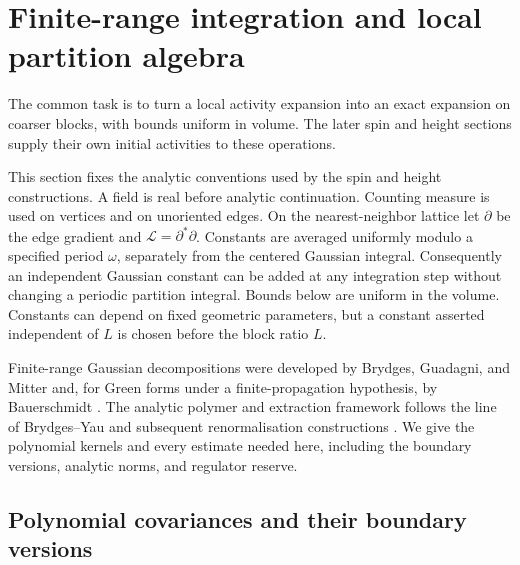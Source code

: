 \section{Finite-range integration and local partition algebra}\label{rg:section}

The common task is to turn a local activity expansion into an exact
expansion on coarser blocks, with bounds uniform in volume.  The later
spin and height sections supply their own initial activities to these
operations.

This section fixes the analytic conventions used by the spin and height constructions.  A field is real before analytic continuation.  Counting measure is used on vertices and on unoriented edges.  On the nearest-neighbor lattice let $\partial$ be the edge gradient and $\mathcal L=\partial^*\partial$.  Constants are averaged uniformly modulo a specified period $\omega$, separately from the centered Gaussian integral.  Consequently an independent Gaussian constant can be added at any integration step without changing a periodic partition integral.  Bounds below are uniform in the volume.  Constants can depend on fixed geometric parameters, but a constant asserted independent of $L$ is chosen before the block ratio $L$.

Finite-range Gaussian decompositions were developed by
Brydges, Guadagni, and Mitter \citep{BrydgesGuadagniMitter2004}
and, for Green forms under a finite-propagation hypothesis, by Bauerschmidt
\citep{Bauerschmidt2013}.  The analytic polymer and extraction
framework follows the line of Brydges--Yau and subsequent
renormalisation constructions \citep{BrydgesYau1990,Brydges2009,BPR2024I}.
We give the polynomial kernels and every estimate needed here,
including the boundary versions, analytic norms, and regulator reserve.

\subsection{Polynomial covariances and their boundary versions}

